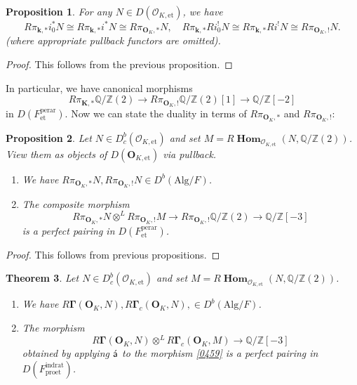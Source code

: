\documentclass{amsart}
\newtheorem{Thm}{Theorem}[subsection]
\newtheorem{Prop}[Thm]{Proposition}
\theoremstyle{remark}
\numberwithin{equation}{subsection}
\newcommand{\Order}{\mathcal{O}}
\newcommand{\tensor}{\mathbin{\otimes}}
\newcommand{\Z}{\mathbb{Z}}
\newcommand{\Q}{\mathbb{Q}}
\newcommand{\et}{\mathrm{et}}
\newcommand{\rat}{\mathrm{rat}}
\newcommand{\ind}{\mathrm{ind}}
\newcommand{\pro}{\mathrm{pro}}
\newcommand{\perar}{\mathrm{perar}}
\newcommand{\Alg}{\mathrm{Alg}}
\newcommand{\alg}[1]{\mathbf{#1}}
\newcommand{\algebrize}{\Acute{\mathsf{a}}}
\DeclareMathOperator{\sheafhom}{\alg{Hom}}
\begin{document}
\begin{Prop} \label{0201}
	For any $N \in D(\Order_{K, \et})$, we have
		\[
				R \pi_{\alg{k}, \ast} i_{0}^{\ast} N
			\cong
				R \pi_{\alg{k}, \ast} i^{\ast} N
			\cong
				R \pi_{\alg{O}_{K}, \ast} N,
			\quad
				R \pi_{\alg{k}, \ast} R i_{0}^{!} N
			\cong
				R \pi_{\alg{k}, \ast} R i^{!} N
			\cong
				R \pi_{\alg{O}_{K}, !} N.
		\]
	(where appropriate pullback functors are omitted).
\end{Prop}

\begin{proof}
	This follows from the previous proposition.
\end{proof}

In particular, we have canonical morphisms
	\begin{equation} \label{0510}
			R \pi_{\alg{K}, \ast} \Q / \Z(2)
		\to
			R \pi_{\alg{O}_{K}, !} \Q / \Z(2)[1]
		\to
			\Q / \Z[-2]
	\end{equation}
in $D(F^{\perar}_{\et})$.
Now we can state the duality in terms of
$R \pi_{\alg{O}_{K}, \ast}$ and $R \pi_{\alg{O}_{K}, !}$:

\begin{Prop} \label{0449}
	Let $N \in D^{b}_{c}(\Order_{K, \et})$
	and set $M = R \sheafhom_{\Order_{K, \et}}(N, \Q / \Z(2))$.
	View them as objects of $D(\alg{O}_{K, \et})$ via pullback.
	\begin{enumerate}
		\item
			We have
			$R \pi_{\alg{O}_{K}, \ast} N, R \pi_{\alg{O}_{K}, !} N \in D^{b}(\Alg / F)$.
		\item
			The composite morphism
				\begin{equation} \label{0459}
							R \pi_{\alg{O}_{K}, \ast} N
						\tensor^{L}
							R \pi_{\alg{O}_{K}, !} M
					\to
						R \pi_{\alg{O}_{K}, !} \Q / \Z(2)
					\to
						\Q / \Z[-3]
				\end{equation}
			is a perfect pairing in $D(F^{\perar}_{\et})$.
	\end{enumerate}
\end{Prop}

\begin{proof}
	This follows from previous propositions.
\end{proof}

\begin{Thm}
	Let $N \in D^{b}_{c}(\Order_{K, \et})$
	and set $M = R \sheafhom_{\Order_{K, \et}}(N, \Q / \Z(2))$.
	\begin{enumerate}
		\item
			We have
				$
						R \alg{\Gamma}(\alg{O}_{K}, N),
						R \alg{\Gamma}_{c}(\alg{O}_{K}, N),
					\in
						D^{b}(\Alg / F)
				$.
		\item
			The morphism
				\[
							R \alg{\Gamma}(\alg{O}_{K}, N)
						\tensor^{L}
							R \alg{\Gamma}_{c}(\alg{O}_{K}, M)
					\to
						\Q / \Z[-3]
				\]
			obtained by applying $\algebrize$ to the morphism \eqref{0459}
			is a perfect pairing in $D(F^{\ind\rat}_{\pro\et})$.
	\end{enumerate}
\end{Thm}
\end{document}
